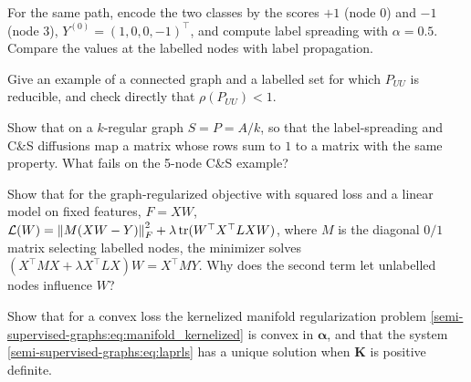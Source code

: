 \begin{notechapter}
\begin{exercise}\label{semi-supervised-graphs:exr:2}
For the same path, encode the two classes by the scores $+1$ (node $0$) and $-1$ (node $3$), $Y^{(0)} = (1, 0, 0, -1)^\top$, and compute label spreading with $\alpha = 0.5$. Compare the values at the labelled nodes with label propagation.
\end{exercise}

\begin{exercise}\label{semi-supervised-graphs:exr:3}
Give an example of a connected graph and a labelled set for which $P_{UU}$ is reducible, and check directly that $\rho(P_{UU}) < 1$.
\end{exercise}

\begin{exercise}\label{semi-supervised-graphs:exr:4}
Show that on a $k$-regular graph $S = P = A/k$, so that the label-spreading and C\&S diffusions map a matrix whose rows sum to $1$ to a matrix with the same property. What fails on the 5-node C\&S example?
\end{exercise}

\begin{exercise}\label{semi-supervised-graphs:exr:5}
Show that for the graph-regularized objective with squared loss and a linear model on fixed features, $F = XW$, $\mathcal L(W) = \left\|M(XW - Y)\right\|_F^2 + \lambda\operatorname{tr}(W^\top X^\top LXW)$, where $M$ is the diagonal $0/1$ matrix selecting labelled nodes, the minimizer solves $(X^\top MX + \lambda X^\top LX)W = X^\top MY$. Why does the second term let unlabelled nodes influence $W$?
\end{exercise}

\begin{exercise}\label{semi-supervised-graphs:exr:6}
Show that for a convex loss the kernelized manifold regularization problem \eqref{semi-supervised-graphs:eq:manifold_kernelized} is convex in $\boldsymbol\alpha$, and that the system \eqref{semi-supervised-graphs:eq:laprls} has a unique solution when $\mathbf K$ is positive definite.
\end{exercise}

\end{notechapter}
